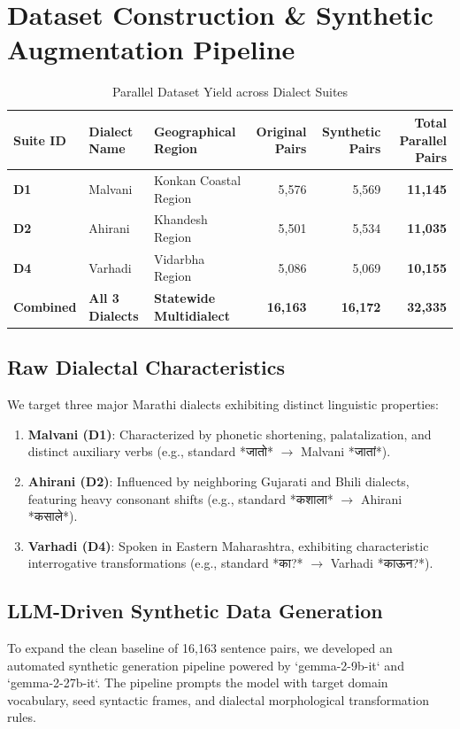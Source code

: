 \documentclass[journal,twocolumn]{IEEEtran}
\begin{document}
\section{Dataset Construction \& Synthetic Augmentation Pipeline}

\begin{table}[t]
\caption{Parallel Dataset Yield across Dialect Suites}
\label{tab:dataset_summary}
\centering
\begin{tabularx}{\textwidth}{l l X r r r}
\toprule
\textbf{Suite ID} & \textbf{Dialect Name} & \textbf{Geographical Region} & \textbf{Original Pairs} & \textbf{Synthetic Pairs} & \textbf{Total Parallel Pairs} \\
\midrule
\textbf{D1} & Malvani & Konkan Coastal Region & 5,576 & 5,569 & \textbf{11,145} \\
\textbf{D2} & Ahirani & Khandesh Region & 5,501 & 5,534 & \textbf{11,035} \\
\textbf{D4} & Varhadi & Vidarbha Region & 5,086 & 5,069 & \textbf{10,155} \\
\midrule
\textbf{Combined} & \textbf{All 3 Dialects} & \textbf{Statewide Multidialect} & \textbf{16,163} & \textbf{16,172} & \textbf{32,335} \\
\bottomrule
\end{tabularx}
\end{table}

\subsection{Raw Dialectal Characteristics}
We target three major Marathi dialects exhibiting distinct linguistic properties:
\begin{enumerate}
    \item \textbf{Malvani (D1)}: Characterized by phonetic shortening, palatalization, and distinct auxiliary verbs (e.g., standard *जातो* $\rightarrow$ Malvani *जातां*).
    \item \textbf{Ahirani (D2)}: Influenced by neighboring Gujarati and Bhili dialects, featuring heavy consonant shifts (e.g., standard *कशाला* $\rightarrow$ Ahirani *कसाले*).
    \item \textbf{Varhadi (D4)}: Spoken in Eastern Maharashtra, exhibiting characteristic interrogative transformations (e.g., standard *का?* $\rightarrow$ Varhadi *काऊन?*).
\end{enumerate}

\subsection{LLM-Driven Synthetic Data Generation}
To expand the clean baseline of 16,163 sentence pairs, we developed an automated synthetic generation pipeline powered by `gemma-2-9b-it` and `gemma-2-27b-it`. The pipeline prompts the model with target domain vocabulary, seed syntactic frames, and dialectal morphological transformation rules. 
\end{document}
